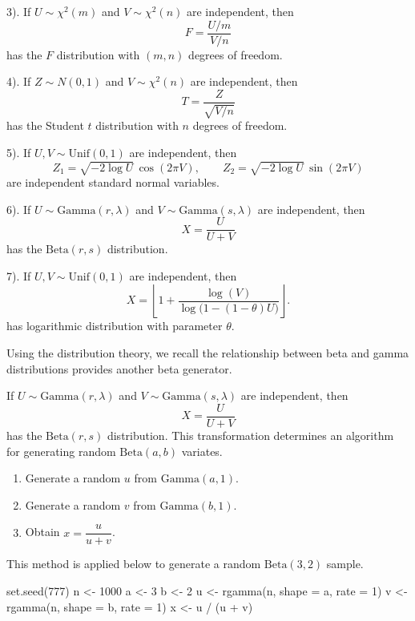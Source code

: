 \documentclass[
  letterpaper,
  DIV=11,
  numbers=noendperiod]{scrreprt}
\newenvironment{Shaded}{\begin{snugshade}}{\end{snugshade}}
\newcommand{\AttributeTok}[1]{\textcolor[rgb]{0.40,0.45,0.13}{#1}}
\newcommand{\DecValTok}[1]{\textcolor[rgb]{0.68,0.00,0.00}{#1}}
\newcommand{\FunctionTok}[1]{\textcolor[rgb]{0.28,0.35,0.67}{#1}}
\newcommand{\NormalTok}[1]{\textcolor[rgb]{0.00,0.23,0.31}{#1}}
\newcommand{\OtherTok}[1]{\textcolor[rgb]{0.00,0.23,0.31}{#1}}
\newcommand{\SpecialCharTok}[1]{\textcolor[rgb]{0.37,0.37,0.37}{#1}}
\begin{document}
3). If \(U \sim \chi^2(m)\) and \(V \sim \chi^2(n)\) are independent,
then \[
  F = \frac{U/m}{V/n}
  \] has the \(F\) distribution with \((m,n)\) degrees of freedom.

4). If \(Z \sim N(0,1)\) and \(V \sim \chi^2(n)\) are independent, then
\[
  T = \frac{Z}{\sqrt{V/n}}
  \] has the Student \(t\) distribution with \(n\) degrees of freedom.

5). If \(U,V \sim \text{Unif}(0,1)\) are independent, then \[
  Z_1 = \sqrt{-2 \log U}\, \cos(2\pi V), 
  \qquad
  Z_2 = \sqrt{-2 \log U}\, \sin(2\pi V)
  \] are independent standard normal variables.

6). If \(U \sim \text{Gamma}(r,\lambda)\) and
\(V \sim \text{Gamma}(s,\lambda)\) are independent, then \[
  X = \frac{U}{U+V}
  \] has the \(\text{Beta}(r,s)\) distribution.

7). If \(U,V \sim \text{Unif}(0,1)\) are independent, then \[
  X = \left\lfloor 1 + \frac{\log(V)}{\log\big(1 - (1-\theta)U\big)} \right\rfloor.
  \] has logarithmic distribution with parameter \(\theta\).

Using the distribution theory, we recall the relationship between beta
and gamma distributions provides another beta generator.

If \(U \sim \mathrm{Gamma}(r,\lambda)\) and
\(V \sim \mathrm{Gamma}(s,\lambda)\) are independent, then \[
X=\frac{U}{U+V}
\] has the \(\mathrm{Beta}(r,s)\) distribution. This transformation
determines an algorithm for generating random \(\mathrm{Beta}(a,b)\)
variates.

\begin{enumerate}
\def\labelenumi{\arabic{enumi}.}
\item
  Generate a random \(u\) from \(\mathrm{Gamma}(a,1)\).
\item
  Generate a random \(v\) from \(\mathrm{Gamma}(b,1)\).
\item
  Obtain \(x=\dfrac{u}{u+v}\).
\end{enumerate}

This method is applied below to generate a random \(\mathrm{Beta}(3,2)\)
sample.

\begin{Shaded}
\begin{Highlighting}[]
\FunctionTok{set.seed}\NormalTok{(}\DecValTok{777}\NormalTok{)}
\NormalTok{n }\OtherTok{\textless{}{-}} \DecValTok{1000}
\NormalTok{a }\OtherTok{\textless{}{-}} \DecValTok{3}
\NormalTok{b }\OtherTok{\textless{}{-}} \DecValTok{2}
\NormalTok{u }\OtherTok{\textless{}{-}} \FunctionTok{rgamma}\NormalTok{(n, }\AttributeTok{shape =}\NormalTok{ a, }\AttributeTok{rate =} \DecValTok{1}\NormalTok{)}
\NormalTok{v }\OtherTok{\textless{}{-}} \FunctionTok{rgamma}\NormalTok{(n, }\AttributeTok{shape =}\NormalTok{ b, }\AttributeTok{rate =} \DecValTok{1}\NormalTok{)}
\NormalTok{x }\OtherTok{\textless{}{-}}\NormalTok{ u }\SpecialCharTok{/}\NormalTok{ (u }\SpecialCharTok{+}\NormalTok{ v)}
\end{Highlighting}
\end{Shaded}
\end{document}
